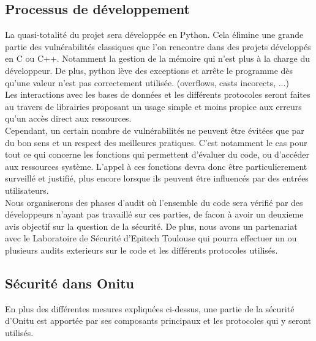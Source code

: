 \subsection{Processus de développement}

La quasi-totalité du projet sera développée en Python. Cela élimine une grande partie des vulnérabilités classiques que l'on rencontre dans des projets développés en C ou C++. Notamment la gestion de la mémoire qui n'est plus à la charge du développeur. De plus, python lève des exceptions et arrête le programme dès qu'une valeur n'est pas correctement utilisée. (overflows, casts incorects, ...)\\
Les interactions avec les bases de données et les différents protocoles seront faites au travers de librairies proposant un usage simple et moins propice aux erreurs qu'un accès direct aux ressources.\\
Cependant, un certain nombre de vulnérabilités ne peuvent être évitées que par du bon sens et un respect des meilleures pratiques. C'est notamment le cas pour tout ce qui concerne les fonctions qui permettent d'évaluer du code, ou d'accéder aux ressources système. L'appel à ces fonctions devra donc être particulierement surveillé et justifié, plus encore lorsque ils peuvent être influencés par des entrées utilisateurs.\\
Nous organiserons des phases d'audit où l'ensemble du code sera vérifié par des développeurs n'ayant pas travaillé sur ces parties, de facon à avoir un deuxieme avis objectif sur la question de la sécurité. De plus, nous avons un partenariat avec le Laboratoire de Sécurité d'Epitech Toulouse qui pourra effectuer un ou plusieurs audits exterieurs sur le code et les différents protocoles utilisés.

\subsection{Sécurité dans Onitu}

En plus des différentes mesures expliquées ci-dessus, une partie de la sécurité d'Onitu est apportée par ses composants principaux et les protocoles qui y seront utilisés.

